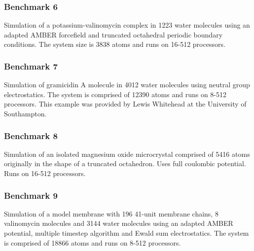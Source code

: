 \subsubsection{Benchmark 6}

Simulation of a potassium-valinomycin complex in 1223 water molecules
using an adapted AMBER forcefield and truncated octahedral periodic
boundary conditions. The system size is 3838 atoms and runs on 16-512
processors.

\subsubsection{Benchmark 7}

Simulation of gramicidin A molecule in 4012 water molecules using
neutral group electrostatics. The system is comprised of 12390 atoms
and runs on 8-512 processors. This example was provided by Lewis
Whitehead at the University of Southampton.

\subsubsection{Benchmark 8}

Simulation of an isolated magnesium oxide microcrystal comprised of
5416 atoms originally in the shape of a truncated octahedron. Uses
full coulombic potential. Runs on 16-512 processors.

\subsubsection{Benchmark 9}

Simulation of a model membrane with 196 41-unit membrane chains, 8
valinomycin molecules and 3144 water molecules using an adapted AMBER
potential, multiple timestep algorithm and Ewald sum electrostatics. 
The system is comprised of 18866 atoms and runs on 8-512 processors.

\clearpage


